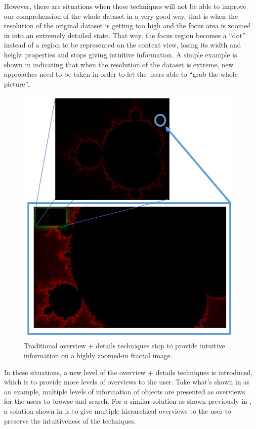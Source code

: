 However, there are situations when these techniques will not be able to improve our comprehension of the whole dataset in a very good way, that is when the resolution of the original dataset is getting too high and the focus area is zoomed in into an extremely detailed state. That way, the focus region becomes a ``dot'' instead of a region to be represented on the context view, losing its width and height properties and stops giving intuitive information. A simple example is shown in  indicating that when the resolution of the dataset is extreme, new approaches need to be taken in order to let the users able to ``grab the whole picture''.

\begin{figure}[H]
\centering
\includegraphics{Figures/Chapter1/becomespoint.png}
\decoRule
\caption[Focus Region Becomes A Dot On Context Region]{Traditional overview + details techniques stop to provide intuitive information on a highly zoomed-in fractal image.}
\label{fig:becomespoint}
\end{figure}

In these situations, a new level of the overview + details techniques is introduced, which is to provide more levels of overviews to the user. Take what's shown in  as an example, multiple levels of information of objects are presented as overviews for the users to browse and search. For a similar solution as shown previously in , a solution shown in  is to give multiple hierarchical overviews to the user to preserve the intuitiveness of the techniques.

